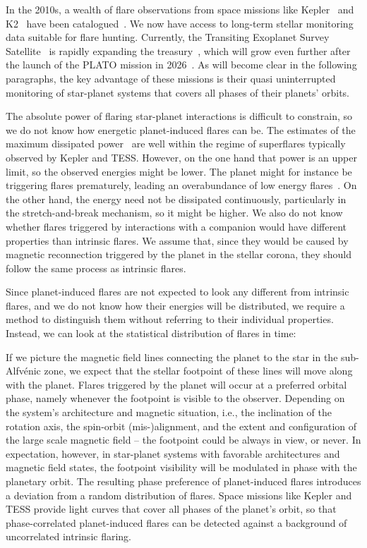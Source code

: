 \documentclass[twocolumn]{aastex631}
\begin{document}
In the 2010s, a wealth of flare observations from space missions like Kepler~\citep{borucki2010kepler} and K2~\citep{howell2014k2} have been catalogued~\citep{davenport2016kepler, paudel2018k2, ilin2021flares}. We now have access to long-term stellar monitoring data suitable for flare hunting. Currently, the Transiting Exoplanet Survey Satellite~\citep{ricker2015transiting} is rapidly expanding the treasury~\citep{gunther2020stellar}, which will grow even further after the launch of the PLATO mission in 2026~\citep{rauer2014plato}. As will become clear in the following paragraphs, the key advantage of these missions is their quasi uninterrupted monitoring of star-planet systems that covers all phases of their planets' orbits.

The absolute power of flaring star-planet interactions is difficult to constrain, so we do not know how energetic planet-induced flares can be. The estimates of the maximum dissipated power~\citep{lanza2018closeby} are well within the regime of superflares typically observed by Kepler and TESS. However, on the one hand that power is an upper limit, so the observed energies might be lower. The planet might for instance be triggering flares prematurely, leading an overabundance of low energy flares~\citep{loyd2023flares}. On the other hand, the energy need not be dissipated continuously, particularly in the stretch-and-break mechanism, so it might be higher. We also do not know whether flares triggered by interactions with a companion would have different properties than intrinsic flares. We assume that, since they would be caused by magnetic reconnection triggered by the planet in the stellar corona, they should follow the same process as intrinsic flares. 

Since planet-induced flares are not expected to look any different from intrinsic flares, and we do not know how their energies will be distributed, we require a method to distinguish them without referring to their individual properties. Instead, we can look at the statistical distribution of flares in time: 

If we picture the magnetic field lines connecting the planet to the star in the sub-Alfv\'enic zone, we expect that the stellar footpoint of these lines will move along with the planet. Flares triggered by the planet will occur at a preferred orbital phase, namely whenever the footpoint is visible to the observer. Depending on the system's architecture and magnetic situation, i.e., the inclination of the rotation axis, the spin-orbit (mis-)alignment, and the extent and configuration of the large scale magnetic field -- the footpoint could be always in view, or never. In expectation, however, in star-planet systems with favorable architectures and magnetic field states, the footpoint visibility will be modulated in phase with the planetary orbit. The resulting phase preference of planet-induced flares introduces a deviation from a random distribution of flares. Space missions like Kepler and TESS provide light curves that cover all phases of the planet's orbit, so that phase-correlated planet-induced flares can be detected against a background of uncorrelated intrinsic flaring. 
\end{document}
